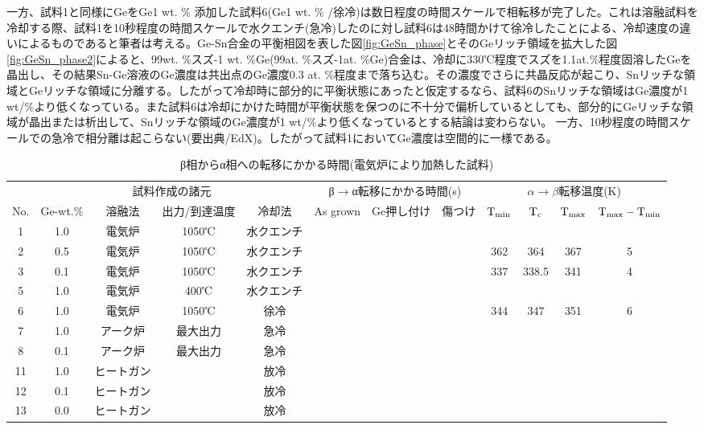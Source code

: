 一方、試料1と同様にGeをGe1 wt. \% 添加した試料6(Ge1 wt. \% /徐冷)は数日程度の時間スケールで相転移が完了した。これは溶融試料を冷却する際、試料1を10秒程度の時間スケールで水クエンチ(急冷)したのに対し試料6は48時間かけて徐冷したことによる、冷却速度の違いによるものであると筆者は考える。Ge-Sn合金の平衡相図を表した図\ref{fig:GeSn_phase}とそのGeリッチ領域を拡大した図\ref{fig:GeSn_phase2}によると、99wt. \%スズ-1 wt. \%Ge(99at. \%スズ-1at. \%Ge)合金は、冷却に330℃程度でスズを1.1at.\%程度固溶したGeを晶出し、その結果Sn-Ge溶液のGe濃度は共出点のGe濃度0.3 at. \%程度\cite{Thurmond1960}まで落ち込む。その濃度でさらに共晶反応が起こり、Snリッチな領域とGeリッチな領域に分離する。したがって冷却時に部分的に平衡状態にあったと仮定するなら、試料6のSnリッチな領域はGe濃度が1 wt/\%より低くなっている。また試料6は冷却にかけた時間が平衡状態を保つのに不十分で偏析しているとしても、部分的にGeリッチな領域が晶出または析出して、Snリッチな領域のGe濃度が1 wt/\%より低くなっているとする結論は変わらない。
一方、10秒程度の時間スケールでの急冷で相分離は起こらない(要出典/EdX)。したがって試料1においてGe濃度は空間的に一様である。
\begin{landscape}
\begin{table}[!h]
    \begin{center}
  \begin{tabular}{c|cccc|ccc|cccc}
&  \multicolumn{4}{|c|}{試料作成の諸元}&\multicolumn{3}{|c|}{β$\to$α転移にかかる時間(s)}&\multicolumn{4}{|c}{$\alpha\to\beta$転移温度(K)}\\
No.&Ge-wt.\%&溶融法&出力/到達温度&冷却法&As grown&Ge押し付け&傷つけ&$\rm T_{min}$&$\rm T_c$&$\rm T_{max}$&$\rm T_{max}-T_{min}$\\ \hline
1&1.0&電気炉&1050℃&水クエンチ&&&&&&\\
2&0.5&電気炉&1050℃&水クエンチ&&&&362&364&367&5\\
3&0.1&電気炉&1050℃&水クエンチ&&&&337&338.5&341&4\\
5&1.0&電気炉&400℃&水クエンチ&&&&&&&\\
6&1.0&電気炉&1050℃&徐冷&&&&344&347&351&6\\
7&1.0&アーク炉&最大出力&急冷&&&&&&&\\
8&0.1&アーク炉&最大出力&急冷&&&&&&&\\
11&1.0&ヒートガン&&放冷&&&&&&&\\
12&0.1&ヒートガン&&放冷&&&&&&&\\
13&0.0&ヒートガン&&放冷&&&&&&&\\
  \end{tabular}
  \caption{β相からα相への転移にかかる時間(電気炉により加熱した試料)}
  \label{tab:trans_Time}
    \end{center}
\end{table}
\end{landscape}
%

